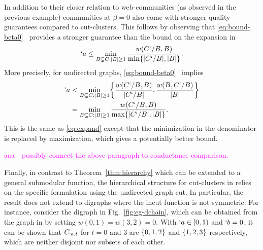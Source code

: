 %
	In addition to their closer relation to web-communities (as observed in the previous example) communities at
	$\beta = 0$ 
	also come with stronger quality guarantees compared to cut-clusters.  This follows by observing that \eqref{eq:bound-beta0}~
provides a stronger guarantee than the bound on the expansion in \cite[Theorem~3.3]{flake:cut-clustering} 
\begin{align}
  `a \leq \min_{B\subsetneq C: \lvert B\rvert\geq 1} \frac{w(C`/B,B)}{\min\{\lvert C`/B\rvert,\lvert B\rvert\}}. \label{eq:expand}
\end{align}
More precisely, for undirected graphs, \eqref{eq:bound-beta0}~ implies
\begin{align}
  \begin{split}
  `a &< \min_{B\subsetneq C: \abs{B}\geq 1} \Set*{\frac{w(C`/B,B)}{\abs{C`/B}}, \frac{w(B,C`/B)}{\abs{B}}}\\
  &= \min_{B\subsetneq C: \abs{B}\geq 1} \frac{w(C`/B,B)}{\max\Set{\abs{C`/B},\abs{B}}}.
  \end{split}
  \label{eq:expand_improved}
\end{align}
This is the same as \eqref{eq:expand} except that the minimization in the denominator is replaced by
maximization, which gives a potentially better bound.

\textcolor{magenta}{
	aaa---possibly connect the above paragraph to conductance comparison.
}



Finally, in contrast to Theorem~\ref{thm:hierarchy} which can be extended to a general submodular function,
the hierarchical structure for cut-clusters in \cite[Lemma~3.9]{flake:cut-clustering} relies on the specific
formulation using the undirected graph cut. In particular, the result does not extend to digraphs
where the incut function is not symmetric. For instance, consider the digraph in 
Fig.~\ref{fig:eg-dchain}, which can be obtained from the graph in 
by setting $w(0,1)=w(3,2)=0$.
With $`a\in [0,1)$ and $`b=0$, it can be shown that $C_{`a,t}$ for $t=0$ and $3$ are
$\{0,1,2\}$ and $\{1,2,3\}$ respectively, which are neither disjoint nor subsets of each
other.



